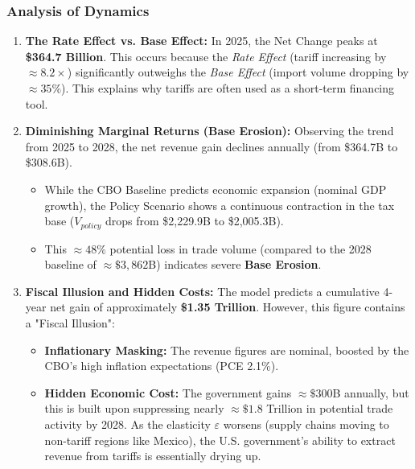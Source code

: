 \documentclass{apmcmthesis}
\begin{document}
\subsubsection{Analysis of Dynamics}
\begin{enumerate}
    \item \textbf{The Rate Effect vs. Base Effect:} 
    In 2025, the Net Change peaks at \textbf{\$364.7 Billion}. This occurs because the \textit{Rate Effect} (tariff increasing by $\approx 8.2\times$) significantly outweighs the \textit{Base Effect} (import volume dropping by $\approx 35\%$). This explains why tariffs are often used as a short-term financing tool.

    \item \textbf{Diminishing Marginal Returns (Base Erosion):}
    Observing the trend from 2025 to 2028, the net revenue gain declines annually (from \$364.7B to \$308.6B).
    \begin{itemize}
        \item While the CBO Baseline predicts economic expansion (nominal GDP growth), the Policy Scenario shows a continuous contraction in the tax base ($V_{policy}$ drops from \$2,229.9B to \$2,005.3B).
        \item This $\approx 48\%$ potential loss in trade volume (compared to the 2028 baseline of $\approx \$3,862$B) indicates severe \textbf{Base Erosion}.
    \end{itemize}

    \item \textbf{Fiscal Illusion and Hidden Costs:}
    The model predicts a cumulative 4-year net gain of approximately \textbf{\$1.35 Trillion}. However, this figure contains a "Fiscal Illusion":
    \begin{itemize}
        \item \textbf{Inflationary Masking:} The revenue figures are nominal, boosted by the CBO's high inflation expectations (PCE 2.1\%).
        \item \textbf{Hidden Economic Cost:} The government gains $\approx \$300$B annually, but this is built upon suppressing nearly $\approx \$1.8$ Trillion in potential trade activity by 2028. As the elasticity $\varepsilon$ worsens (supply chains moving to non-tariff regions like Mexico), the U.S. government's ability to extract revenue from tariffs is essentially drying up.
    \end{itemize}
\end{enumerate}
\end{document}
